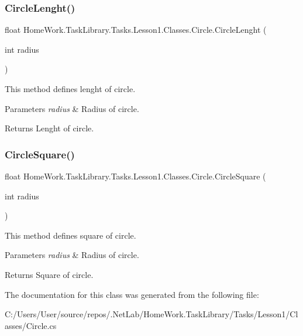 \subsubsection{\texorpdfstring{CircleLenght()}{CircleLenght()}}
{\footnotesize\ttfamily float Home\+Work.\+Task\+Library.\+Tasks.\+Lesson1.\+Classes.\+Circle.\+Circle\+Lenght (\begin{DoxyParamCaption}\item[{int}]{radius }\end{DoxyParamCaption})}



This method defines lenght of circle. 


\begin{DoxyParams}{Parameters}
{\em radius} & Radius of circle.\\
\hline
\end{DoxyParams}
\begin{DoxyReturn}{Returns}
Lenght of circle.
\end{DoxyReturn}
\mbox{\label{class_home_work_1_1_task_library_1_1_tasks_1_1_lesson1_1_1_classes_1_1_circle_af72a39cb5b4db04890a5f2e34fba920e}} 
\subsubsection{\texorpdfstring{CircleSquare()}{CircleSquare()}}
{\footnotesize\ttfamily float Home\+Work.\+Task\+Library.\+Tasks.\+Lesson1.\+Classes.\+Circle.\+Circle\+Square (\begin{DoxyParamCaption}\item[{int}]{radius }\end{DoxyParamCaption})}



This method defines square of circle. 


\begin{DoxyParams}{Parameters}
{\em radius} & Radius of circle.\\
\hline
\end{DoxyParams}
\begin{DoxyReturn}{Returns}
Square of circle.
\end{DoxyReturn}


The documentation for this class was generated from the following file\+:\begin{DoxyCompactItemize}
\item 
C\+:/\+Users/\+User/source/repos/.\+Net\+Lab/\+Home\+Work.\+Task\+Library/\+Tasks/\+Lesson1/\+Classes/Circle.\+cs\end{DoxyCompactItemize}
